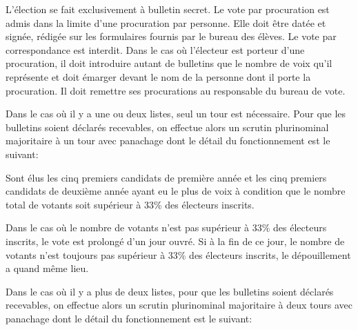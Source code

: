 \documentclass{article}
\begin{document}
				L’élection se fait exclusivement à bulletin secret. Le vote par
				procuration est admis dans la limite d’une procuration par
				personne. Elle doit être datée et signée, rédigée sur les
				formulaires fournis par le bureau des élèves. Le vote par
				correspondance est interdit. Dans le cas où l’électeur est
				porteur d’une procuration, il doit introduire autant de
				bulletins que le nombre de voix qu’il représente et doit émarger
				devant le nom de la personne dont il porte la procuration. Il
				doit remettre ses procurations au responsable du bureau de vote.
				
				Dans le cas où il y a une ou deux listes, seul un tour est
				nécessaire. Pour que les bulletins soient déclarés recevables,
				on effectue alors un scrutin plurinominal majoritaire à un tour
				avec panachage dont le détail du fonctionnement est le suivant:

				\begin{adjustwidth}{1cm}{}
					Sont élus les cinq premiers candidats de première année et
					les cinq premiers candidats de deuxième année ayant eu le
					plus de voix à condition que le nombre total de votants soit
					supérieur à 33\% des électeurs inscrits.

					Dans le cas où le nombre de votants n’est pas supérieur à
					33\% des électeurs inscrits, le vote est prolongé d’un jour
					ouvré. Si à la fin de ce jour, le nombre de votants n’est
					toujours pas supérieur à 33\% des électeurs inscrits, le
					dépouillement a quand même lieu.
				\end{adjustwidth}

				Dans le cas où il y a plus de deux listes, pour que les
				bulletins soient déclarés recevables, on effectue alors un
				scrutin plurinominal majoritaire à deux tours avec panachage
				dont le détail du fonctionnement est le suivant:
\end{document}
